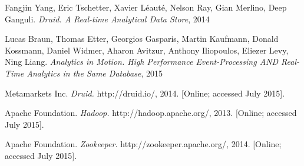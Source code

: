 \documentclass[11pt,singlecolumn]{scrartcl}
\begin{document}
\clearpage

\begin{thebibliography}{1}
 Fangjin Yang, Eric Tschetter, Xavier Léauté, Nelson Ray, Gian Merlino, Deep Ganguli.
{\em Druid. A Real-time Analytical Data Store}, 2014

 Lucas Braun, Thomas Etter, Georgios Gasparis,
Martin Kaufmann, Donald Kossmann, Daniel Widmer, Aharon Avitzur, Anthony Iliopoulos, Eliezer Levy, Ning Liang.
{\em Analytics in Motion. High Performance Event-Processing AND Real-Time Analytics in the Same Database}, 2015

Metamarkets Inc. {\em Druid.} http://druid.io/, 2014. [Online; accessed July 2015].

Apache Foundation. {\em Hadoop.} http://hadoop.apache.org/, 2013. [Online; accessed July 2015].

Apache Foundation. {\em Zookeeper.} http://zookeeper.apache.org/, 2014. [Online; accessed July 2015].


\end{thebibliography}
\end{document}
